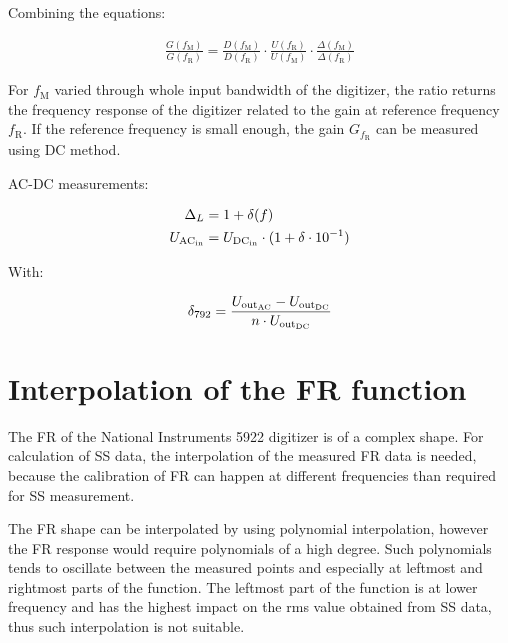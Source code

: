 %
%
Combining the equations:

\begin{align}
	\frac{G(f_\text{M})}{G(f_\text{R})} = \frac{D(f_\text{M})}{D(f_\text{R})} \cdot \frac{U(f_\text{R})}{U(f_\text{M})} \cdot \frac{\Delta(f_\text{M})}{\Delta(f_\text{R})}
\end{align}


For $f_\text{M}$ varied through whole input bandwidth of the digitizer, the
ratio returns the frequency response of the digitizer related to the gain at
reference frequency $f_\text{R}$. If the reference frequency is small enough,
the gain $G_{f_\text{R}}$ can be measured using DC method.

\textcolor{red}{}

AC-DC measurements:

\begin{align}
	\Delta_L        & = 1 + \delta(f)                                    \\
	U_{\rm AC_{in}} & = U_{\rm DC_{in}} \cdot (1 + \delta \cdot 10^{-1})
\end{align}

With:

\begin{align}
	\delta_{792} = \frac{U_{\rm out_{AC}} - U_{\rm out_{DC}}}{n\cdot U_{\rm out_{DC}}}
\end{align}

\section{Interpolation of the FR function}
The FR of the National Instruments 5922 digitizer is of a complex shape. For
calculation of SS data, the interpolation of the measured FR data is needed,
because the calibration of FR can happen at different frequencies than required
for SS measurement.

The FR shape can be interpolated by using polynomial interpolation, however the
FR response would require polynomials of a high degree. Such polynomials tends to
oscillate between the measured points and especially at leftmost and rightmost
parts of the function. The leftmost part of the function is at lower frequency
and has the highest impact on the rms value obtained from SS data, thus such
interpolation is not suitable.


